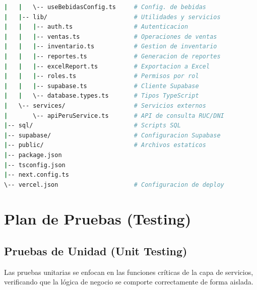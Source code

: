 \documentclass[12pt, a4paper]{article}
\begin{document}
\begin{lstlisting}[language=bash, caption={Árbol de directorios del proyecto}]
|   |   \-- useBebidasConfig.ts     # Config. de bebidas
|   |-- lib/                        # Utilidades y servicios
|   |   |-- auth.ts                 # Autenticacion
|   |   |-- ventas.ts               # Operaciones de ventas
|   |   |-- inventario.ts           # Gestion de inventario
|   |   |-- reportes.ts             # Generacion de reportes
|   |   |-- excelReport.ts          # Exportacion a Excel
|   |   |-- roles.ts                # Permisos por rol
|   |   |-- supabase.ts             # Cliente Supabase
|   |   \-- database.types.ts       # Tipos TypeScript
|   \-- services/                   # Servicios externos
|       \-- apiPeruService.ts       # API de consulta RUC/DNI
|-- sql/                            # Scripts SQL
|-- supabase/                       # Configuracion Supabase
|-- public/                         # Archivos estaticos
|-- package.json
|-- tsconfig.json
|-- next.config.ts
\-- vercel.json                     # Configuracion de deploy
\end{lstlisting}

\section{Plan de Pruebas (Testing)}

\subsection{Pruebas de Unidad (Unit Testing)}

Las pruebas unitarias se enfocan en las funciones críticas de la capa de servicios, verificando que la lógica de negocio se comporte correctamente de forma aislada.
\end{document}
